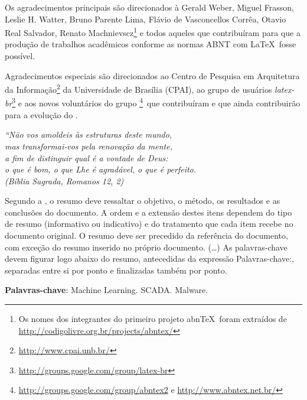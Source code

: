 \documentclass[
	12pt,				%
	openright,			%
    oneside,
	a4paper,			%
	chapter=TITLE,
	english,			%
	brazil				%
	]{./abntex2}
\newcommand{\keywordone}{Machine Learning}
\newcommand{\keywordtwo}{SCADA}
\newcommand{\keywordthree}{Malware}
\begin{document}
\begin{agradecimentos}
Os agradecimentos principais são direcionados à Gerald Weber, Miguel Frasson, Leslie H. Watter, Bruno Parente Lima, Flávio de Vasconcellos Corrêa, Otavio Real Salvador, Renato Machnievscz\footnote{Os nomes dos integrantes do primeiro projeto abn\TeX\ foram extraídos de \url{http://codigolivre.org.br/projects/abntex/}} e todos aqueles que contribuíram para que a produção de trabalhos acadêmicos conforme as normas ABNT com \LaTeX\ fosse possível.

Agradecimentos especiais são direcionados ao Centro de Pesquisa em Arquitetura da Informação\footnote{\url{http://www.cpai.unb.br/}} da Universidade de Brasília (CPAI), ao grupo de usuários \emph{latex-br}\footnote{\url{http://groups.google.com/group/latex-br}} e aos novos voluntários do grupo \emph{\abnTeX}\footnote{\url{http://groups.google.com/group/abntex2} e \url{http://www.abntex.net.br/}}~que contribuíram e que ainda contribuirão para a evolução do \abnTeX.

\end{agradecimentos}

\begin{epigrafe}
    \vspace*{\fill}
	\begin{flushright}
		\textit{``Não vos amoldeis às estruturas deste mundo, \\
		mas transformai-vos pela renovação da mente, \\
		a fim de distinguir qual é a vontade de Deus: \\
		o que é bom, o que Lhe é agradável, o que é perfeito.\\
		(Bíblia Sagrada, Romanos 12, 2)}
	\end{flushright}
\end{epigrafe}


\setlength{\absparsep}{18pt} %
\begin{resumo}
\SingleSpacing
 Segundo a , o resumo deve ressaltar o
 objetivo, o método, os resultados e as conclusões do documento. A ordem e a extensão
 destes itens dependem do tipo de resumo (informativo ou indicativo) e do
 tratamento que cada item recebe no documento original. O resumo deve ser
 precedido da referência do documento, com exceção do resumo inserido no
 próprio documento. (\ldots) As palavras-chave devem figurar logo abaixo do
 resumo, antecedidas da expressão Palavras-chave:, separadas entre si por
 ponto e finalizadas também por ponto.

 \textbf{Palavras-chave}: \keywordone. \keywordtwo. \keywordthree.
\end{resumo}
\end{document}
